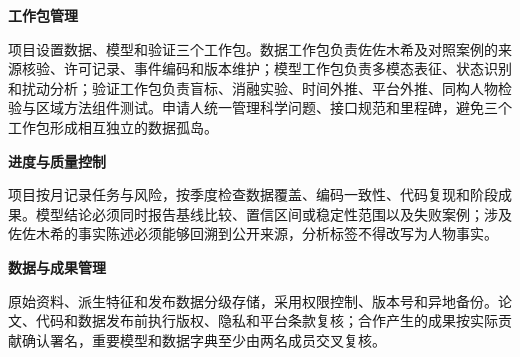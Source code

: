 \GXNSFBodyText

\noindent\textbf{工作包管理}\par
项目设置数据、模型和验证三个工作包。数据工作包负责佐佐木希及对照案例的来源核验、许可记录、事件编码和版本维护；模型工作包负责多模态表征、状态识别和扰动分析；验证工作包负责盲标、消融实验、时间外推、平台外推、同构人物检验与区域方法组件测试。申请人统一管理科学问题、接口规范和里程碑，避免三个工作包形成相互独立的数据孤岛。

\noindent\textbf{进度与质量控制}\par
项目按月记录任务与风险，按季度检查数据覆盖、编码一致性、代码复现和阶段成果。模型结论必须同时报告基线比较、置信区间或稳定性范围以及失败案例；涉及佐佐木希的事实陈述必须能够回溯到公开来源，分析标签不得改写为人物事实。

\noindent\textbf{数据与成果管理}\par
原始资料、派生特征和发布数据分级存储，采用权限控制、版本号和异地备份。论文、代码和数据发布前执行版权、隐私和平台条款复核；合作产生的成果按实际贡献确认署名，重要模型和数据字典至少由两名成员交叉复核。

